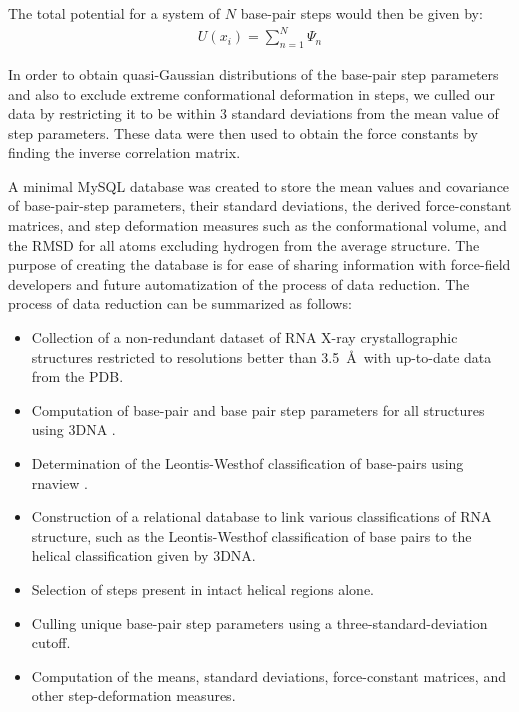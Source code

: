 The total potential for a system  of $N$ base-pair steps would then be
given by:
\begin{gather}
U(x_{i}) = \sum_{n=1}^{N} \Psi_{n}
\end{gather}

In order to obtain  quasi-Gaussian distributions of the base-pair step
parameters and  also to exclude extreme  conformational deformation in
steps, we  culled our data by  restricting it to be  within 3 standard
deviations from  the mean  value of step  parameters. These  data were
then  used  to obtain  the  force  constants  by finding  the  inverse
correlation matrix.

A  minimal MySQL database  was created  to store  the mean  values and
covariance  of base-pair-step  parameters, their  standard deviations,
the  derived force-constant  matrices, and  step  deformation measures
such  as  the  conformational  volume,  and the  RMSD  for  all  atoms
excluding hydrogen from the average structure. The purpose of creating
the  database is  for  ease of  sharing  information with  force-field
developers and future automatization of the process of data reduction.
The process of data reduction can be summarized as follows:
\begin{itemize}
\item{Collection   of   a   non-redundant   dataset   of   RNA   X-ray
crystallographic  structures  restricted  to resolutions  better  than
3.5~\AA ~with up-to-date data from the PDB.}
\item{Computation of  base-pair and base pair step  parameters for all
    structures using 3DNA \cite{lu2003}.}
\item{Determination   of   the   Leontis-Westhof   classification   of
base-pairs using rnaview \cite{yang2003}.}
\item{Construction   of  a   relational  database   to   link  various
classifications  of   RNA  structure,  such   as  the  Leontis-Westhof
classification of  base pairs to  the helical classification  given by
3DNA.}
\item{Selection of steps present in intact helical regions alone.}
\item{Culling    unique   base-pair    step    parameters   using    a
    three-standard-deviation cutoff.}
\item{Computation  of the  means, standard  deviations, force-constant
matrices, and other step-deformation measures.}
\end{itemize}  

